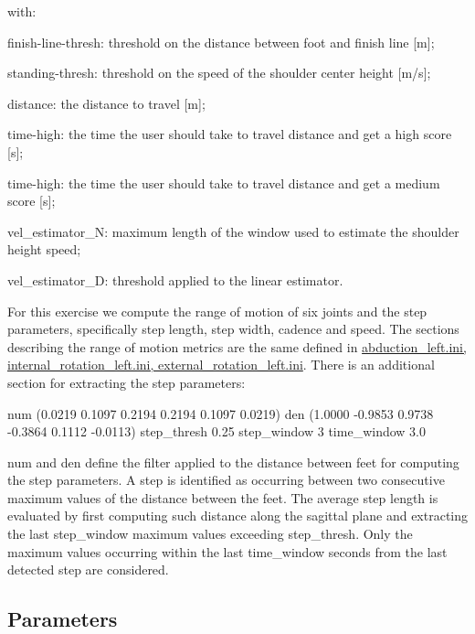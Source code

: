 with\+:
\begin{DoxyItemize}
\item {\ttfamily finish-\/line-\/thresh}\+: threshold on the distance between foot and finish line \mbox{[}m\mbox{]};
\item {\ttfamily standing-\/thresh}\+: threshold on the speed of the shoulder center height \mbox{[}m/s\mbox{]};
\item {\ttfamily distance}\+: the distance to travel \mbox{[}m\mbox{]};
\item {\ttfamily time-\/high}\+: the time the user should take to travel {\ttfamily distance} and get a high score \mbox{[}s\mbox{]};
\item {\ttfamily time-\/high}\+: the time the user should take to travel {\ttfamily distance} and get a medium score \mbox{[}s\mbox{]};
\item {\ttfamily vel\+\_\+estimator\+\_\+N}\+: maximum length of the window used to estimate the shoulder height speed;
\item {\ttfamily vel\+\_\+estimator\+\_\+D}\+: threshold applied to the linear estimator.
\end{DoxyItemize}

For this exercise we compute the range of motion of six joints and the step parameters, specifically step length, step width, cadence and speed. The sections describing the range of motion metrics are the same defined in \hyperlink{group__motionAnalyzer_sec-abduction}{abduction\+\_\+left.\+ini, internal\+\_\+rotation\+\_\+left.\+ini, external\+\_\+rotation\+\_\+left.\+ini}. There is an additional section for extracting the step parameters\+:


\begin{DoxyCode}
[step\_0]
num                            (0.0219 0.1097 0.2194 0.2194 0.1097 0.0219)
den                            (1.0000 -0.9853 0.9738 -0.3864 0.1112 -0.0113)
step\_thresh                    0.25
step\_window                    3
time\_window                    3.0
\end{DoxyCode}


{\ttfamily num} and {\ttfamily den} define the filter applied to the distance between feet for computing the step parameters. A step is identified as occurring between two consecutive maximum values of the distance between the feet. The average step length is evaluated by first computing such distance along the sagittal plane and extracting the last {\ttfamily step\+\_\+window} maximum values exceeding {\ttfamily step\+\_\+thresh}. Only the maximum values occurring within the last {\ttfamily time\+\_\+window} seconds from the last detected step are considered.\hypertarget{group__skeletonViewer_parameters_sec}{}\subsection{Parameters}\label{group__skeletonViewer_parameters_sec}

